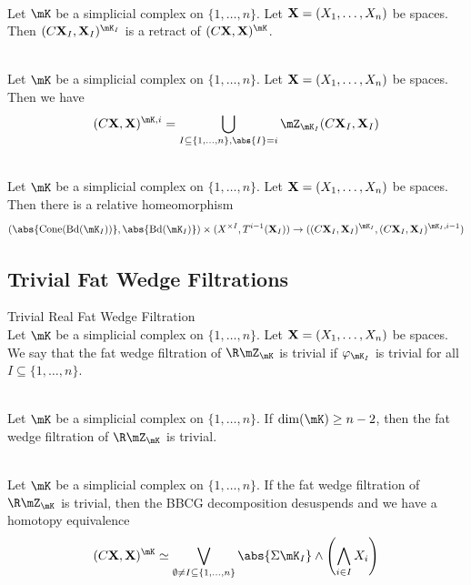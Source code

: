 \documentclass[a4paper]{article}
\begin{document}
\begin{lmm}{}{}\\
Let $\mK$ be a simplicial complex on $\{1,\dots,n\}$. Let $\bold{X}=(X_1,\dots,X_n)$ be spaces. Then $(C\bold{X}_I,\bold{X}_I)^{\mK_I}$ is a retract of $(C\bold{X},\bold{X})^\mK$. 
\end{lmm}

\begin{prp}{}{}\\
Let $\mK$ be a simplicial complex on $\{1,\dots,n\}$. Let $\bold{X}=(X_1,\dots,X_n)$ be spaces. Then we have $$(C\bold{X},\bold{X})^{\mK,i}=\bigcup_{I\subseteq\{1,\dots,n\},\abs{I}=i}\mZ_{\mK_I}(C\bold{X}_I,\bold{X}_I)$$
\end{prp}

\begin{prp}{}{}\\
Let $\mK$ be a simplicial complex on $\{1,\dots,n\}$. Let $\bold{X}=(X_1,\dots,X_n)$ be spaces. Then there is a relative homeomorphism $$(\abs{\text{Cone}(\text{Bd}(\mK_I))},\abs{\text{Bd}(\mK_I)})\times(X^{\times I},T^{i-1}(\bold{X}_I))\to((C\bold{X}_I,\bold{X}_I)^{\mK_I},(C\bold{X}_I,\bold{X}_I)^{\mK_I,i-1})$$
\end{prp}

\subsection{Trivial Fat Wedge Filtrations}
\begin{defn}{Trivial Real Fat Wedge Filtration}{}\\
Let $\mK$ be a simplicial complex on $\{1,\dots,n\}$. Let $\bold{X}=(X_1,\dots,X_n)$ be spaces. We say that the fat wedge filtration of $\R\mZ_\mK$ is trivial if $\varphi_{\mK_I}$ is trivial for all $I\subseteq\{1,\dots,n\}$. 
\end{defn}

\begin{prp}{}{}\\
Let $\mK$ be a simplicial complex on $\{1,\dots,n\}$. If $\dim(\mK)\geq n-2$, then the fat wedge filtration of $\R\mZ_\mK$ is trivial. 
\end{prp}

\begin{thm}{}{}\\
Let $\mK$ be a simplicial complex on $\{1,\dots,n\}$. If the fat wedge filtration of $\R\mZ_\mK$ is trivial, then the BBCG decomposition desuspends and we have a homotopy equivalence $$(C\bold{X},\bold{X})^\mK\simeq\bigvee_{\emptyset\neq I\subseteq\{1,\dots,n\}}\abs{\Sigma\mK_I}\wedge\left(\bigwedge_{i\in I}X_i\right)$$
\end{thm}
\end{document}
